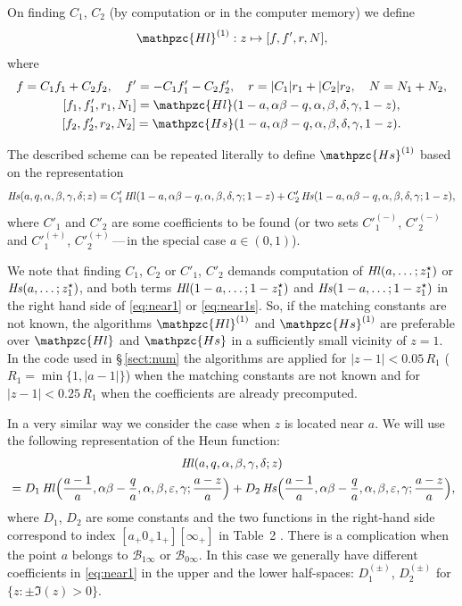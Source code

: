 \documentclass[11pt]{article}
\newcommand{\MF}[1]{\mathop{#1}\nolimits}
\newcommand{\BCzero}{\mathscr{B}_{0\infty}}%
\newcommand{\BCone}{\mathscr{B}_{1\infty}}%
\def\HeunL{\MF{\textit{Hl\/}}}%
\def\HeunS{\MF{\textit{Hs\/}}}%
\def\psHeunLfin{\mathpzc{Hl}}%
\def\psHeunSfin{\mathpzc{Hs}}%
\def\psHeunLnearone{\mathpzc{Hl}^{(1)}}%
\def\psHeunSnearone{\mathpzc{Hs}^{(1)}}%
\def\midpoint#1{z^\star_{#1}}%
\begin{document}
On finding $C_1$, $C_2$ (by computation or in the computer memory) we define
\begin{equation*}
 \psHeunLnearone: z\mapsto [f,f',r,N],
\end{equation*}
where 
\begin{gather*}
 f=C_1 f_1 + C_2 f_2,\quad 
 f'=-C_1 f'_1 - C_2 f'_2,\quad
 r = |C_1|r_1 + |C_2|r_2,\quad
 N = N_1 + N_2,\\
 [f_1,f'_1,r_1,N_1]=\psHeunLfin(1-a,\alpha\beta-q,\alpha,\beta,\delta,\gamma,1-z),\\
 [f_2,f'_2,r_2,N_2]=\psHeunSfin(1-a,\alpha\beta-q,\alpha,\beta,\delta,\gamma,1-z).
\end{gather*}

The described scheme can be repeated literally to define $\psHeunSnearone$ based
on the representation
\begin{equation}
\HeunS(a,q,\alpha,\beta,\gamma,\delta;z) = C'_1
\HeunL(1-a,\alpha\beta-q,\alpha,\beta,\delta,\gamma;1-z)+ C'_2
\HeunS(1-a,\alpha\beta-q,\alpha,\beta,\delta,\gamma;1-z),
\label{eq:near1s}
\end{equation}
where $C'_1$ and $C'_2$ are some coefficients to be found (or two sets
${C'}^{(-)}_1$, ${C'}^{(-)}_2$ and ${C'}^{(+)}_1$, ${C'}^{(+)}_2$\,---\,in the
special case $a\in(0,1)$).

We note that finding $C_1$, $C_2$ or $C'_1$, $C'_2$ demands computation of
$\HeunL(a,\ldots;\midpoint{1})$ or $\HeunS(a,\ldots;\midpoint{1})$, and both
terms $\HeunL(1-a,\ldots;1-\midpoint{1})$ and
$\HeunS(1-a,\ldots;1-\midpoint{1})$ in the right hand side of \eqref{eq:near1}
or \eqref{eq:near1s}. So, if the matching constants are not known, the
algorithms $\psHeunLnearone$ and $\psHeunSnearone$ are preferable over
$\psHeunLfin$ and $\psHeunSfin$ in a sufficiently small vicinity of $z=1$. In
the code used in \S\,\ref{sect:num} the algorithms are applied for $|z-1|<0.05\,R_1$
($R_1=\min\{1,|a-1|\}$) when the matching constants are not known and for
$|z-1|<0.25\,R_1$ when the coefficients are already precomputed.

In a very similar way we consider the case when $z$ is located near $a$. We will
use the following representation of the Heun function:
\begin{multline}
\HeunL(a,q,\alpha,\beta,\gamma,\delta;z)\\{} = D_1
 \HeunL\Bigl(\frac{a-1}{a},\alpha\beta-\frac{q}{a},
 \alpha,\beta,\varepsilon,\gamma;\frac{a-z}{a}\Bigr)
 +D_2\HeunS\Bigl(\frac{a-1}{a},\alpha\beta-\frac{q}{a},\alpha,\beta,\varepsilon,\gamma;\frac{a-z}{a}\Bigr),
\label{eq:neara}
\end{multline}
where $D_1$, $D_2$ are some constants and the two functions in the right-hand
side correspond to index $[a_+0_+1_+][\infty_+]$ in Table~2
\cite{192-Maier2007}. There is a complication when the point $a$ belongs to
$\BCone$ or $\BCzero$. In this case we generally have different coefficients in
\eqref{eq:near1} in the upper and the lower half-spaces: $D^{(\pm)}_1$,
$D^{(\pm)}_2$ for $\{z:\pm\Im(z)>0\}$.
\end{document}
